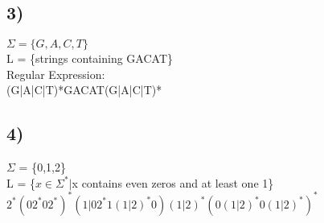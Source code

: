 \documentclass[12pt]{article}
\begin{document}
	\subsection*{3)}
	$\Sigma = \{G,A,C,T\}$\\
	L = \{strings containing GACAT\}\\
	
	Regular Expression:\\
	(G|A|C|T)*GACAT(G|A|C|T)*\\
	
	\subsection*{4)}
	$\Sigma$ = \{0,1,2\}\\
	L = \{$x \in \Sigma^* | $x contains even zeros and at least one 1\}\\
	
	$2^*(02^*02^*)^*(1|02^*1(1|2)^*0)(1|2)^*(0(1|2)^*0(1|2)^*)^*$\\
	
	
\end{document}
